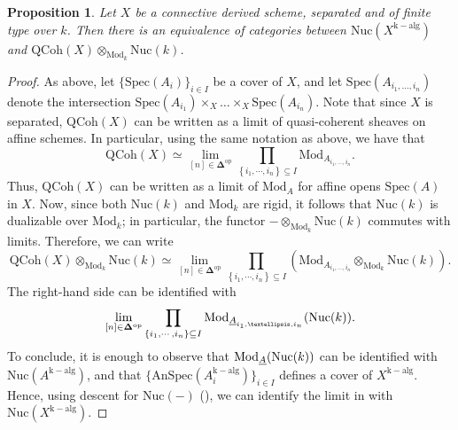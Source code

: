 \documentclass[10pt,a4paper]{amsart}
\newtheorem{proposition}{Proposition}
\newcommand{\Mod}{\mathrm{Mod}}
\newcommand{\Nuc}{\mathrm{Nuc}}
\newcommand{\Qcoh}{\mathrm{QCoh}}
\newcommand{\Spec}{\mathrm{Spec}}
\newcommand{\bDelta}{\bm{\Delta}} %
\begin{document}
\begin{proposition}\label{prop: algebraic GAGA}
    Let $X$ be a connective derived scheme, separated and of finite type over $k$. Then there is an equivalence of categories between $\Nuc(X^{\mathrm{k-alg}})$ and $\Qcoh(X)\otimes_{\Mod_{k}}\Nuc(k)$.
\end{proposition}

\begin{proof}
    As above, let $\{\Spec(A_{i})\}_{i \in I}$ be a cover of $X$, and let $\Spec(A_{i_1, \dots, i_{n}})$ denote the intersection $\Spec(A_{i_{1}})\times_{X}\dots \times_{X}\Spec(A_{i_{n}})$. Note that since $X$ is separated, $\Qcoh(X)$ can be written as a limit of quasi-coherent sheaves on affine schemes. In particular, using the same notation as above, we have that 
    \[
    \Qcoh(X) \simeq \lim_{[n]\in\bDelta^{\mathrm{op}}}\prod_{\left\{i_1,\cdots,i_n\right\}\subseteq I}\Mod_{A_{i_1, \dots, i_{n}}}.
    \]
    Thus, $\Qcoh(X)$ can be written as a limit of $\Mod_{A}$ for affine opens $\Spec(A)$ in $X$.
    Now, since both $\Nuc(k)$ and $\Mod_{k}$ are rigid, it follows that $\Nuc(k)$ is dualizable over $\Mod_{k}$; in particular, the functor 
    $-\otimes_{\Mod_{k}}\Nuc(k)$ commutes with limits. Therefore, we can write 
    \begin{equation}\label{eq:Kunneth limit}
        \Qcoh(X)\otimes_{\Mod_{k}}\Nuc(k) \simeq \lim_{[n]\in\bDelta^{\mathrm{op}}}\prod_{\left\{i_1,\cdots,i_n\right\}\subseteq I}\left(\Mod_{A_{i_1, \dots, i_{n}}}\otimes_{\Mod_k}\Nuc(k)\right).
    \end{equation}
    The right-hand side can be identified with 
    \[
     \lim_{[n]\in\bDelta^{\mathrm{op}}}\prod_{\left\{i_1,\cdots,i_n\right\}\subseteq I}\Mod_{\uline{A}_{i_1, \dots, i_{n}}}(\Nuc(k)).
    \]
    To conclude, it is enough to observe that $\Mod_{\uline{A}}(\Nuc(k))$ can be identified with $\Nuc(A^{\mathrm{k-alg}})$, and that $\{\mathrm{AnSpec}(A_i^{\mathrm{k-alg}})\}_{i \in I}$ defines a cover of $X^{\mathrm{k-alg}}$. Hence, using descent for $\Nuc(-)$ (), we can identify the limit in  with $\Nuc(X^{\mathrm{k-alg}})$.
\end{proof}
\end{document}
